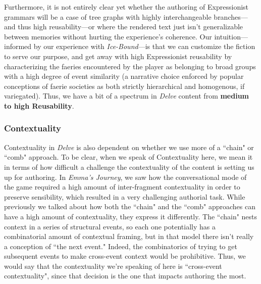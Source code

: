 Furthermore, it is not entirely clear yet whether the authoring of Expressionist grammars will be a case of tree graphs with highly interchangeable branches---and thus high reusability---or where the rendered text just isn't generalizable between memories without hurting the experience's coherence. Our intuition---informed by our experience with \textit{Ice-Bound}---is that we can customize the fiction to serve our purpose, and get away with high Expressionist reusability by characterizing the faeries encountered by the player as belonging to broad groups with a high degree of event similarity (a narrative choice enforced by popular conceptions of faerie societies as both strictly hierarchical and homogenous, if variegated). Thus, we have a bit of a spectrum in \textit{Delve} content from \textbf{medium to high Reusability}.

\subsubsection{Contextuality}\label{subsubsec:delve-contextuality}

Contextuality in \textit{Delve} is also dependent on whether we use more of a ``chain" or ``comb" approach. To be clear, when we speak of Contextuality here, we mean it in terms of how difficult a challenge the contextuality of the content is setting us up for authoring. In \textit{Emma's Journey}, we saw how the conversational mode of the game required a high amount of inter-fragment contextuality in order to preserve sensibility, which resulted in a very challenging authorial task. While previously we talked about how both the ``chain" and the ``comb" approaches can have a high amount of contextuality, they express it differently. The ``chain" nests context in a series of structural events, so each one potentially has a combinatorial amount of contextual framing, but in that model there isn't really a conception of ``the next event." Indeed, the combinatorics of trying to get subsequent events to make cross-event context would be prohibitive. Thus, we would say that the contextuality we're speaking of here is ``cross-event contextuality", since that decision is the one that impacts authoring the most.

